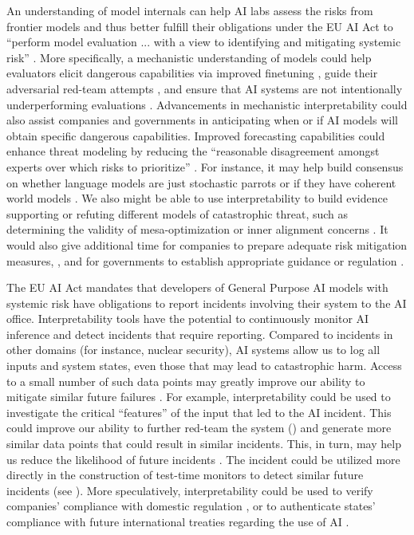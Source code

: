 An understanding of model internals can help AI labs assess the risks from frontier models \citep{Chang_2024_SurveyLLM, shevlane2023modelevaluationextremerisks,Casper_2024} and thus better fulfill their obligations under the EU AI Act to “perform model evaluation ... with a view to identifying and mitigating systemic risk” \citep{eu2024ai}. More specifically, a mechanistic understanding of models could help evaluators elicit dangerous capabilities via improved finetuning \citep{ukAISI2024early}, guide their adversarial red-team attempts \citep{tong2024massproducingfailuresmultimodalsystems}, and ensure that AI systems are not intentionally underperforming evaluations \citep{vanderweij2024aisandbagginglanguagemodels}. Advancements in mechanistic interpretability could also assist companies and governments in anticipating when or if AI models will obtain specific dangerous capabilities. Improved forecasting capabilities could enhance threat modeling by reducing the “reasonable disagreement amongst experts over which risks to prioritize” \citep{anthropic_rsp}. For instance, it may help build consensus on whether language models are just stochastic parrots \citep{bender2021dangers} or if they have coherent world models \citep{li2024emergentworldrepresentationsexploring}. We also might be able to use interpretability to build evidence supporting or refuting different models of catastrophic threat, such as determining the validity of mesa-optimization \citep{hubinger2021riskslearnedoptimizationadvanced} or inner alignment concerns \citep{carlsmith2023schemingaisaisfake}. It would also give additional time for companies to prepare adequate risk mitigation measures, \citep{openai2023preparedness}, and for governments to establish appropriate guidance or regulation \citep{ukgov2022ai}.

The EU AI Act mandates that developers of General Purpose AI models with systemic risk have obligations to report incidents involving their system to the AI office. Interpretability tools have the potential to continuously monitor AI inference and detect incidents that require reporting. Compared to incidents in other domains (for instance, nuclear security), AI systems allow us to log all inputs and system states, even those that may lead to catastrophic harm. Access to a small number of such data points may greatly improve our ability to mitigate similar future failures \citep{greenblatt2024catching}. For example, interpretability could be used to investigate the critical “features” of the input that led to the AI incident. This could improve our ability to further red-team the system () and generate more similar data points that could result in similar incidents. This, in turn, may help us reduce the likelihood of future incidents \citep{chan2024visibilityaiagents}. The incident could be utilized more directly in the construction of test-time monitors to detect similar future incidents (see \citet{roger2023coup}). More speculatively, interpretability could be used to verify companies' compliance with domestic regulation \citep{obrien2023deploymentcorrectionsincidentresponse}, or to authenticate states' compliance with future international treaties regarding the use of AI \citep{aarne2024secure}.

